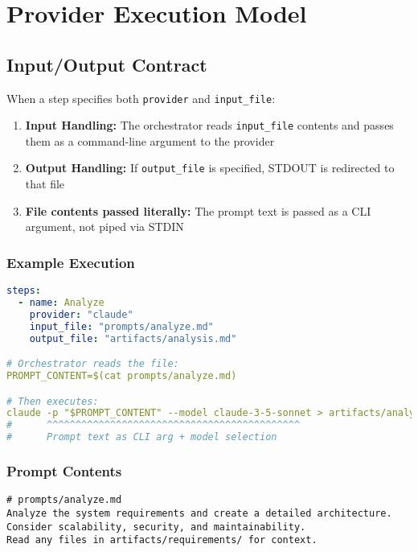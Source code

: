\documentclass[11pt,a4paper]{article}
\begin{document}
\section{Provider Execution Model}

\subsection{Input/Output Contract}

When a step specifies both \texttt{provider} and \texttt{input\_file}:

\begin{enumerate}
    \item \textbf{Input Handling:} The orchestrator reads \texttt{input\_file} contents and passes them as a command-line argument to the provider
    \item \textbf{Output Handling:} If \texttt{output\_file} is specified, STDOUT is redirected to that file
    \item \textbf{File contents passed literally:} The prompt text is passed as a CLI argument, not piped via STDIN
\end{enumerate}

\subsubsection{Example Execution}

\begin{lstlisting}[language=yaml, caption={Provider Execution Example}]
steps:
  - name: Analyze
    provider: "claude"
    input_file: "prompts/analyze.md"
    output_file: "artifacts/analysis.md"

# Orchestrator reads the file:
PROMPT_CONTENT=$(cat prompts/analyze.md)

# Then executes:
claude -p "$PROMPT_CONTENT" --model claude-3-5-sonnet > artifacts/analysis.md
#      ^^^^^^^^^^^^^^^^^^^^^^^^^^^^^^^^^^^^^^^^^^^^
#      Prompt text as CLI arg + model selection
\end{lstlisting}

\subsubsection{Prompt Contents}

\begin{lstlisting}[caption={Example Prompt Content}]
# prompts/analyze.md
Analyze the system requirements and create a detailed architecture.
Consider scalability, security, and maintainability.
Read any files in artifacts/requirements/ for context.
\end{lstlisting}
\end{document}
